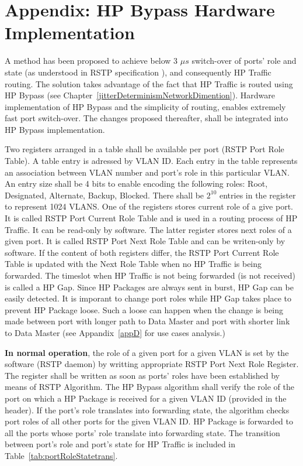 \chapter{Appendix: HP Bypass Hardware Implementation}
\label{appC}


A method has been proposed to achieve below 3 $\mu s$ switch-over of
ports' role and state (as understood in RSTP specification \cite{IEEE8021D}),
and consequently HP Traffic routing. The solution takes advantage of the fact
that HP Traffic is routed using HP Bypass (see
Chapter~\ref{jitterDeterminismNetworkDimention}). Hardware implementation of HP
Bypass and the simplicity of routing, enables extremely fast port switch-over.
The changes proposed thereafter, shall be integrated into HP Bypass
implementation.

Two registers arranged in a table shall be available per port (RSTP Port Role
Table). A table entry is adressed by VLAN ID. Each entry in the table
represents an association between VLAN number and port's role in this particular
VLAN. An entry size shall be 4 bits to enable encoding the following roles:
Root, Designated, Alternate, Backup, Blocked. There shall be $2^10$ entries
in the register to represent 1024 VLANS. One of the registers stores current
role of a give port. It is called RSTP Port Current Role Table and is
used in a routing process of HP Traffic. It can be read-only by software. The
latter register stores next roles of a given port. It is called RSTP Port Next
Role Table and can be writen-only by software. If the content of both registers
differ, the RSTP Port Current Role Table is updated with the Next Role
Table when no HP Traffic is being forwarded. The timeslot when HP Traffic is
not being forwarded (is not received) is called a HP Gap. Since HP Packages are
always sent in burst, HP Gap can be easily detected. It is imporant to change
port roles while HP Gap takes place to prevent HP Package loose. Such a loose
can happen when the change is being made between port with longer path to Data
Master and port with shorter link to Data Master (see Appandix~\ref{appD} for
use cases analysis.)


\textbf{In normal operation}, the role of a given port for a given VLAN is set
by the software (RSTP daemon) by writting appropriate RSTP Port Next Role
Register. The register shall be written as soon as ports' roles have been
established by means of RSTP Algorithm. The HP Bypass algorithm shall verify the
role of the port on which a HP Package is received for a given VLAN ID (provided
in the header). If the port's role translates into forwarding state, the
algorithm checks port roles of all other ports for the given VLAN ID. HP Package
is forwarded to all the ports whose ports' role translate into forwarding state.
The transition between port's role and port's state for HP Traffic is
included in Table~\ref{tab:portRoleStatetrans}.

